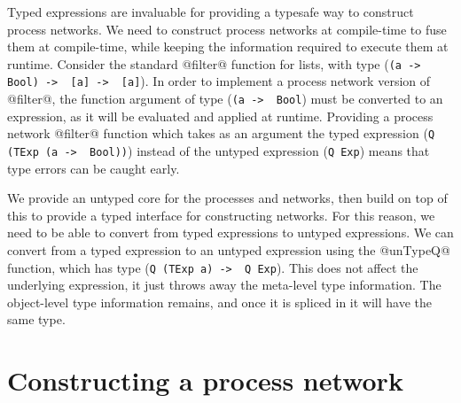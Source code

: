 Typed expressions are invaluable for providing a typesafe way to construct process networks.
We need to construct process networks at compile-time to fuse them at compile-time, while keeping the information required to execute them at runtime.
Consider the standard @filter@ function for lists, with type (\lstinline/(a ->  Bool) ->  [a] ->  [a]/).
In order to implement a process network version of @filter@, the function argument of type (\lstinline/(a ->  Bool/) must be converted to an expression, as it will be evaluated and applied at runtime.
Providing a process network @filter@ function which takes as an argument the typed expression (\lstinline/Q (TExp (a ->  Bool))/) instead of the untyped expression (\lstinline/Q Exp/) means that type errors can be caught early.

We provide an untyped core for the processes and networks, then build on top of this to provide a typed interface for constructing networks.
For this reason, we need to be able to convert from typed expressions to untyped expressions.
We can convert from a typed expression to an untyped expression using the @unTypeQ@ function, which has type (\lstinline/Q (TExp a) ->  Q Exp/).
This does not affect the underlying expression, it just throws away the meta-level type information.
The object-level type information remains, and once it is spliced in it will have the same type.

 


\section{Constructing a process network}
\label{s:extraction:grepGood}

